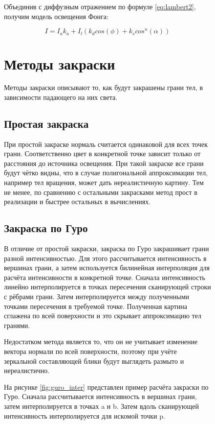 \begin{figure}[h]
Объединив с диффузным отражением по формуле \ref{eq:lambert2}, получим модель освещения Фонга:

\begin{equation}
	\label{eq:fong-model}
	I = I_ak_a + I_{l}(k_dcos(\phi) + k_scos^n(\alpha))
\end{equation}

\section{Методы закраски}
Методы закраски описывают то, как будут закрашены грани тел, в зависимости падающего на них света.

\subsection{Простая закраска}
При простой закраске нормаль считается одинаковой для всех точек грани. Соответственно цвет в конкретной точке зависит только от расстояния до источника освещения.
При такой закраске все грани будут чётко видны, что в случае полигональной аппроксимации тел, например тел вращения, может дать нереалистичную картину. Тем не менее, по сравнению с остальными закрасками метод прост в реализации и быстрее остальных в вычислениях.

\subsection{Закраска по Гуро}
В отличие от простой закраски, закраска по Гуро закрашивает грани разной интенсивностью. Для этого рассчитывается интенсивность в вершинах грани, а затем используется билинейная интерполяция для расчёта интенсивности в конкретной точке.
Сначала интенсивность линейно интерполируется в точках пересечения сканирующей строки с рёбрами грани. Затем интерполируется между полученными точками пересечения в требуемой точке. Полученная картина сглажена по всей поверхности и это скрывает аппроксимацию тел гранями.

Недостатком метода является то, что он не учитывает изменение вектора нормали по всей поверхности, поэтому при учёте зеркальной составляющей блики будут выглядеть размыто и нереалистично.

На рисунке \ref{fig:guro_inter} представлен пример расчёта закраски по Гуро. Сначала рассчитывается интенсивность в вершинах грани, затем интерполируется в точках a и b. Затем вдоль сканирующей  интенсивность интерполируется для искомой точки p.


\end{figure}
